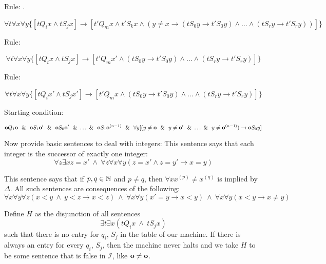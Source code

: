 Rule: .

\[\forall t\forall x\forall y \{[tQ_ix\land  tS_jx] \rightarrow [t'Q_mx\land  t'S_kx \land  (y\ne x \rightarrow (tS_0y\rightarrow t'S_0y)\land \dots\land (tS_ry\rightarrow t'S_ry))]\}\]

Rule: 

\[\forall t\forall x\forall y\{[tQ_tx\land tS_jx]\rightarrow [t'Q_mx' \land  (tS_0y\rightarrow t'S_0y)\land \dots\land (tS_ry\rightarrow t'S_ry)]\}\]

Rule: 

\[\forall t \forall x \forall y \{[tQ_ix' \land  tS_jx']\rightarrow [t'Q_mx\land  (tS_0y\rightarrow t'S_0y)\land \dots\land (tS_ry\rightarrow t'S_ry)]\}\]

Starting condition:

\[\mathbf{o} Q_1 \mathbf{o}\ ~\&~ \ \mathbf{o} S_1\mathbf{o}'\ ~\&~ \ \mathbf{o} S_0\mathbf{o} '\ ~\&~ \dots~\&~ \ \mathbf{o} S_1\mathbf{o}^{(n-1)}\ ~\&~ \ \forall y [(y\ne \mathbf{o}\ ~\&~ \ y\ne \mathbf{o}'\ ~\&~ \dots~\&~ \ y\ne \mathbf{o}^{(n-1)}) \rightarrow \mathbf{o} S_0y]\]

Now provide basic sentences to deal with integers:
This sentence says that each integer is the successor of exactly one integer:
\[\forall z\exists x z = x'\ \land  \ \forall z\forall x\forall y (z=x'\land z=y'\rightarrow x=y)\]

This sentence says that if $p,q\in\mathbb{N}$ and $p\ne q$, then $\forall x x^{(p)}\ne x^{(q)}$ is implied by $\Delta$. All such sentences are consequences of the following:
\[\forall x\forall y\forall z (x < y\ \land \ y < z\rightarrow x<z)\ \land \ \forall x\forall y(x'=y\rightarrow x<y)\ \land \ \forall x\forall y(x<y\rightarrow x\ne y)\]

Define $H$ as the disjunction of all sentences
\[\exists t\exists x (tQ_i x\ \land \ tS_jx)\]
such that there is no entry for $q_i$, $S_j$ in the table of our machine. If there is always an entry for every $q_i$, $S_j$, then the machine never halts and we take $H$ to be some sentence that is false in $\mathscr{I}$, like $\mathbf{o}\ne \mathbf{o}$.
